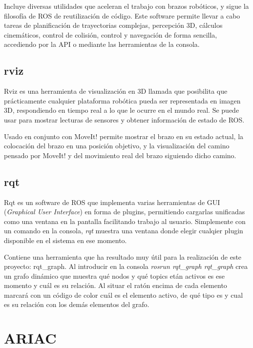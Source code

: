Incluye diversas utilidades que aceleran el trabajo con brazos robóticos, y sigue la filosofía de ROS de reutilización de código. Este software permite llevar a cabo tareas de planificación de trayectorias complejas, percepción 3D, cálculos cinemáticos, control de colisión, control y navegación de forma sencilla, accediendo por la API o mediante las herramientas de la consola.


\subsection{rviz}
\label{subsec:inf_rviz}

Rviz\cite{rviz} es una herramienta de visualización en 3D llamada que posibilita que  prácticamente cualquier plataforma robótica pueda ser representada en imagen 3D, respondiendo en tiempo real a lo que le ocurre en el mundo real. Se puede usar para mostrar lecturas de sensores y obtener información de estado de ROS.

Usado en conjunto con MoveIt! permite mostrar el brazo en su estado actual, la colocación del brazo en una posición objetivo, y la visualización del camino pensado por MoveIt! y del movimiento real del brazo siguiendo dicho camino.

\subsection{rqt}
\label{subsec:inf_rqt}

Rqt\cite{rqt} es un software de ROS que implementa varias herramientas de GUI (\textit{Graphical User Interface}) en forma de plugins, permitiendo cargarlas unificadas como una ventana en la pantalla facilitando trabajo al usuario. Simplemente con un comando en la consola, \textit{rqt} muestra una ventana donde elegir cualqier plugin disponible en el sistema en ese momento.

Contiene una herramienta que ha resultado muy útil para la realización de este proyecto: rqt\_graph. Al introducir en la consola \textit{rosrun rqt\_graph rqt\_graph} crea un grafo dinámico que muestra qué nodos y qué topics etán activos es ese momento y cuál es su relación. Al situar el ratón encima de cada elemento marcará con un código de color cuál es el elemento activo, de qué tipo es y cual es su relación con los demás elementos del grafo.


\section{ARIAC}
\label{sec:inf_ariac}

